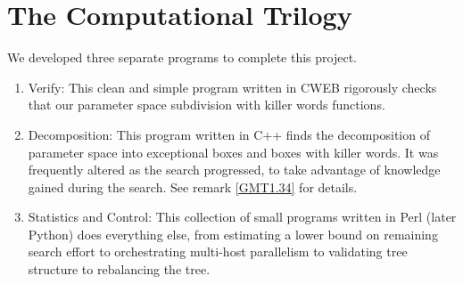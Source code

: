 \section{The Computational Trilogy}
We developed three separate programs to complete this
project.
\begin{enumerate}
	\item Verify:
		This clean and simple program written in CWEB
		rigorously checks that
		our parameter space subdivision with killer words functions.
	\item Decomposition:
		This program written in C++ finds the decomposition of
		parameter space into exceptional boxes and boxes with killer words.
		It was frequently altered as the search progressed,
		to take advantage of knowledge gained during the search.
		See remark \ref{GMT1.34} for details.
	\item Statistics and Control:
		This collection of small programs written in Perl (later Python)
		does everything else,
		from estimating a lower bound on remaining search effort
		to orchestrating multi-host parallelism
		to validating tree structure to rebalancing the tree.
\end{enumerate}
